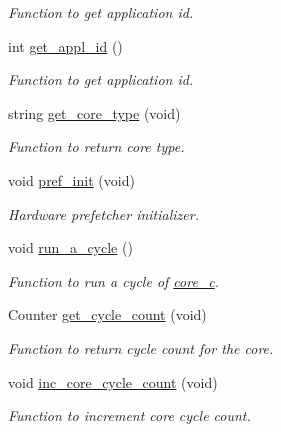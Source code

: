 \begin{DoxyCompactItemize}
\begin{DoxyCompactList}\small\item\em Function to get application id. \item\end{DoxyCompactList}\item 
int \hyperlink{classcore__c_aafc1397f8425510790e6e8298fdeb9c1}{get\_\-appl\_\-id} ()
\begin{DoxyCompactList}\small\item\em Function to get application id. \item\end{DoxyCompactList}\item 
string \hyperlink{classcore__c_ad4e358e95503db6be24847ff26f687fc}{get\_\-core\_\-type} (void)
\begin{DoxyCompactList}\small\item\em Function to return core type. \item\end{DoxyCompactList}\item 
void \hyperlink{classcore__c_a965475b8e7b34e7e5158af747a5f521a}{pref\_\-init} (void)
\begin{DoxyCompactList}\small\item\em Hardware prefetcher initializer. \item\end{DoxyCompactList}\item 
void \hyperlink{classcore__c_a107fb5df1862a2e9e2ec9261f0cc03d0}{run\_\-a\_\-cycle} ()
\begin{DoxyCompactList}\small\item\em Function to run a cycle of \hyperlink{classcore__c}{core\_\-c}. \item\end{DoxyCompactList}\item 
Counter \hyperlink{classcore__c_a3ef75baaef4193aff0674b155bee744c}{get\_\-cycle\_\-count} (void)
\begin{DoxyCompactList}\small\item\em Function to return cycle count for the core. \item\end{DoxyCompactList}\item 
void \hyperlink{classcore__c_aff44e130b95275ac649b957cfe414532}{inc\_\-core\_\-cycle\_\-count} (void)
\begin{DoxyCompactList}\small\item\em Function to increment core cycle count. \item\end{DoxyCompactList}\item 

\end{DoxyCompactItemize}
